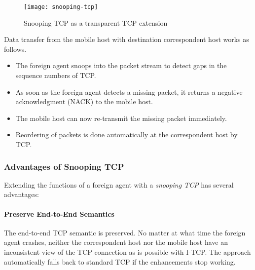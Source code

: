 
\begin{figure}[ht!]
	\centering
	\texttt{[image: snooping-tcp]}
	\caption{Snooping TCP as a transparent TCP extension}\label{fig:snooping-tcp}
\end{figure}



Data transfer from the mobile host with destination correspondent host works as follows. 
\begin{itemize}
	\item The foreign agent snoops into the packet stream to detect gaps in the sequence numbers of TCP.
	\item As soon as the foreign agent detects a missing packet, it returns a negative acknowledgment (NACK) to the mobile host. 
	\item The mobile host can now re-transmit the missing packet immediately. 
	\item Reordering of packets is done automatically at the correspondent host by TCP.
	
\end{itemize}


\subsubsection[Advantages]{Advantages of Snooping TCP}
Extending the functions of a foreign agent with a \textit{snooping TCP} has several advantages:

\paragraph*{Preserve End-to-End Semantics}
The end-to-end TCP semantic is preserved. No matter at what time the foreign agent crashes, neither the correspondent host nor the mobile host have an
inconsistent view of the TCP connection as is possible with I-TCP. The approach automatically falls back to standard TCP if the enhancements
stop working.

